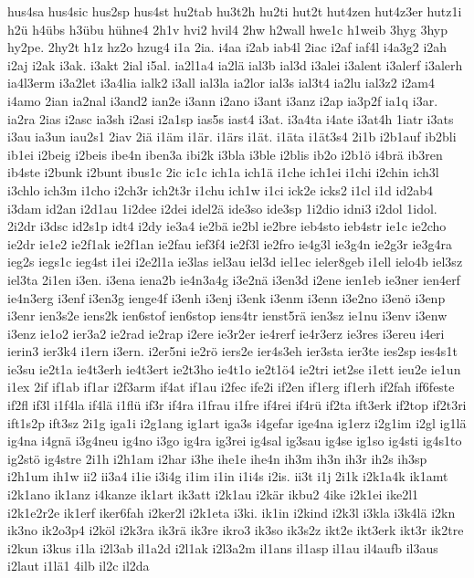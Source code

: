 {hus4sa
hus4sic
hus2sp
hus4st
hu2tab
hu3t2h
hu2ti
hut2t
hut4zen
hut4z3er
hutz1i
h2ü
h4übs
h3übu
hühne4
2h1v
hvi2
hvil4
2hw
h2wall
hwe1c
h1weib
3hyg
3hyp
hy2pe.
2hy2t
h1z
hz2o
hzug4
i1a
2ia.
i4aa
i2ab
iab4l
2iac
i2af
iaf4l
i4a3g2
i2ah
i2aj
i2ak
i3ak.
i3akt
2ial
i5al.
ia2l1a4
ia2lä
ial3b
ial3d
i3alei
i3alent
i3alerf
i3alerh
ia4l3erm
i3a2let
i3a4lia
ialk2
i3all
ial3la
ia2lor
ial3s
ial3t4
ia2lu
ial3z2
i2am4
i4amo
2ian
ia2nal
i3and2
ian2e
i3ann
i2ano
i3ant
i3anz
i2ap
ia3p2f
ia1q
i3ar.
ia2ra
2ias
i2asc
ia3sh
i2asi
i2a1sp
ias5s
iast4
i3at.
i3a4ta
i4ate
i3at4h
1iatr
i3ats
i3au
ia3un
iau2s1
2iav
2iä
i1äm
i1är.
i1ärs
i1ät.
i1äta
i1ät3s4
2i1b
i2b1auf
ib2bli
ib1ei
i2beig
i2beis
ibe4n
iben3a
ibi2k
i3bla
i3ble
i2blis
ib2o
i2b1ö
i4brä
ib3ren
ib4ste
i2bunk
i2bunt
ibus1c
2ic
ic1c
ich1a
ich1ä
i1che
ich1ei
i1chi
i2chin
ich3l
i3chlo
ich3m
i1cho
i2ch3r
ich2t3r
i1chu
ich1w
i1ci
ick2e
icks2
i1cl
i1d
id2ab4
i3dam
id2an
i2d1au
1i2dee
i2dei
idel2ä
ide3so
ide3sp
1i2dio
idni3
i2dol
1idol.
2i2dr
i3dsc
id2s1p
idt4
i2dy
ie3a4
ie2bä
ie2bl
ie2bre
ieb4sto
ieb4str
ie1c
ie2cho
ie2dr
ie1e2
ie2f1ak
ie2f1an
ie2fau
ief3f4
ie2f3l
ie2fro
ie4g3l
ie3g4n
ie2g3r
ie3g4ra
ieg2s
iegs1c
ieg4st
i1ei
i2e2l1a
ie3las
iel3au
iel3d
iel1ec
ieler8geb
i1ell
ielo4b
iel3sz
iel3ta
2i1en
i3en.
i3ena
iena2b
ie4n3a4g
i3e2nä
i3en3d
i2ene
ien1eb
ie3ner
ien4erf
ie4n3erg
i3enf
i3en3g
ienge4f
i3enh
i3enj
i3enk
i3enm
i3enn
i3e2no
i3enö
i3enp
i3enr
ien3s2e
iens2k
ien6stof
ien6stop
iens4tr
ienst5rä
ien3sz
ie1nu
i3env
i3enw
i3enz
ie1o2
ier3a2
ie2rad
ie2rap
i2ere
ie3r2er
ie4rerf
ie4r3erz
ie3res
i3ereu
i4eri
ierin3
ier3k4
i1ern
i3ern.
i2er5ni
ie2rö
iers2e
ier4s3eh
ier3sta
ier3te
ies2sp
ies4s1t
ie3su
ie2t1a
ie4t3erh
ie4t3ert
ie2t3ho
ie4t1o
ie2t1ö4
ie2tri
iet2se
i1ett
ieu2e
ie1un
i1ex
2if
if1ab
if1ar
i2f3arm
if4at
if1au
i2fec
ife2i
if2en
if1erg
if1erh
if2fah
if6feste
if2fl
if3l
i1f4la
if4lä
i1flü
if3r
if4ra
i1frau
i1fre
if4rei
if4rü
if2ta
ift3erk
if2top
if2t3ri
ift1s2p
ift3sz
2i1g
iga1i
i2g1ang
ig1art
iga3s
i4gefar
ige4na
ig1erz
i2g1im
i2gl
ig1lä
ig4na
i4gnä
i3g4neu
ig4no
i3go
ig4ra
ig3rei
ig4sal
ig3sau
ig4se
ig1so
ig4sti
ig4s1to
ig2stö
ig4stre
2i1h
i2h1am
i2har
i3he
ihe1e
ihe4n
ih3m
ih3n
ih3r
ih2s
ih3sp
i2h1um
ih1w
ii2
ii3a4
i1ie
i3i4g
i1im
i1in
i1i4s
i2is.
ii3t
i1j
2i1k
i2k1a4k
ik1amt
i2k1ano
ik1anz
i4kanze
ik1art
ik3att
i2k1au
i2kär
ikbu2
4ike
i2k1ei
ike2l1
i2k1e2r2e
ik1erf
iker6fah
i2ker2l
i2k1eta
i3ki.
ik1in
i2kind
i2k3l
i3kla
i3k4lä
i2kn
ik3no
ik2o3p4
i2köl
i2k3ra
ik3rä
ik3re
ikro3
ik3so
ik3s2z
ikt2e
ikt3erk
ikt3r
ik2tre
i2kun
i3kus
i1la
i2l3ab
il1a2d
i2l1ak
i2l3a2m
il1ans
il1asp
il1au
il4aufb
il3aus
i2laut
i1lä1
4ilb
il2c
il2da
}
